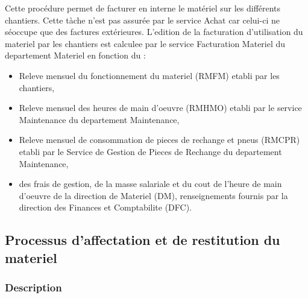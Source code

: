 				Cette procédure permet de facturer en interne le matériel sur les différents chantiers. Cette tàche n'est pas assurée par le service Achat car celui-ci ne séoccupe que des factures extérieures.
				\newline
				L'edition de la facturation d'utilisation du materiel par les chantiers est calculee par le service
Facturation Materiel du departement Materiel en fonction du :
				\begin{itemize}
						    \item Releve mensuel du fonctionnement du materiel (RMFM) etabli par les chantiers,
						    \item Releve mensuel des heures de main d'oeuvre (RMHMO) etabli par le service Maintenance
du departement Maintenance,
						    \item Releve mensuel de consommation de pieces de rechange et pneus (RMCPR) etabli par le Service de Gestion de Pieces de Rechange du departement Maintenance,
						    \item des frais de gestion, de la masse salariale et du cout de l'heure de main d'oeuvre de la
direction de Materiel (DM), renseignements fournis par la direction des Finances et Comptabilite (DFC).
				\end{itemize}
				
				
				

		\subsection{Processus d'affectation et de restitution du materiel}
				\subsubsection{Description}
				
